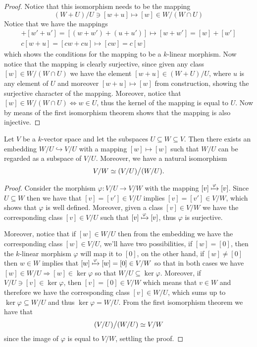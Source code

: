 \begin{proof}
    Notice that this isomorphism needs to be the mapping
    \[
        (W + U)/U \ni [w + u] \longmapsto [w] \in W/(W \cap U)
    \]
    Notice that we have the mappings
    \begin{gather*}
        [w + u] + [w' + u'] = [(w + w')+(u+u')] \longmapsto [w + w'] = [w] + [w']
        \\
        c[w + u] = [cw + cu] \longmapsto [cw] = c[w]
    \end{gather*}
    which shows the conditions for the mapping to be a \(k\)-linear morphism. Now
    notice that the mapping is clearly surjective, since given any class \([w] \in
    W/(W\cap U)\) we have the element \([w + u] \in (W + U)/U\), where \(u\) is
    any element of \(U\) and moreover \([w + u] \mapsto [w]\) from construction,
    showing the surjective character of the mapping. Moreover, notice that \([w]
    \in W/(W\cap U) \Leftrightarrow w \in U\), thus the kernel of the mapping is
    equal to \(U\). Now by means of the first isomorphism theorem shows that the
    mapping is also injective.
\end{proof}

\begin{theorem}\label{thm: third isomorphism}
    Let \(V\) be a \(k\)-vector space and let the subspaces \(U \subseteq W
    \subseteq V\). Then there exists an embedding \(W/U \hookrightarrow V/U\) with
    a mapping \([w] \mapsto [w]\) such that \(W/U\) can be regarded as a subspace
    of \(V/U\). Moreover, we have a natural isomorphism
    \[
        V/W \simeq (V/U) \big / (W/U).
    \]
\end{theorem}

\begin{proof}
    Consider the morphism \(\varphi : V/U \to V/W\) with the mapping \([v]
    \xmapsto \varphi [v]\). Since \(U \subseteq W\) then we have that \([v] = [v']
    \in V/U\) implies \([v] = [v'] \in V/W\), which shows that \(\varphi\) is well
    defined.  Moreover, given a class \([v] \in V/W\) we have the corresponding
    class \([v] \in V/U\) such that \([v] \xmapsto \varphi [v]\), thus
    \(\varphi\) is surjective.

    Moreover, notice that if \([w] \in W/U\) then from the embedding we have the
    corresponding class \([w] \in V/U\), we'll have two possibilities, if \([w] =
    [0]\), then the \(k\)-linear morphism \(\varphi\) will map it to \([0]\), on
    the other hand, if \([w] \neq [0]\) then \(w \in W\) implies that \([w]
    \xmapsto \varphi [w] = [0] \in V/W\) so that in both cases we have \([w] \in
    W/U \Rightarrow [w] \in \ker \varphi\) so that \(W/U \subseteq \ker \varphi\).
    Moreover, if \(V/U \ni [v] \in \ker \varphi\), then \([v] = [0] \in V/W\)
    which means that \(v \in W\) and therefore we have the corresponding class
    \([v] \in W/U\), which sums up to \(\ker \varphi \subseteq W/U\) and thus
    \(\ker \varphi = W/U\).  From the first isomorphism theorem we have that
    \[
        (V/U) \big / (W/U) \simeq V/W
    \]
    since the image of \(\varphi\) is equal to \(V/W\), settling the proof.
\end{proof}
